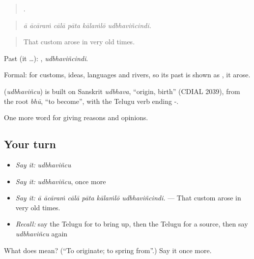 \begin{quote}
     .
\end{quote}

\begin{quote}
\emph{ā ācāraṁ cālā pāta kālaṁlō udbhaviñcindi.}
\end{quote}

\begin{quote}
That custom arose in very old times.
\end{quote}

Past (it …): , \emph{udbhaviñcindi}.

Formal: for customs, ideas, languages and rivers, so its past is shown as , it arose.

\begin{cousinweb}
\textbf{} (\emph{udbhaviñcu}) is built on Sanskrit \emph{udbhava}, \textquotedblleft{}origin, birth\textquotedblright{} (CDIAL 2039), from the root \emph{bhū}, \textquotedblleft{}to become\textquotedblright{}, with the Telugu verb ending -.
\end{cousinweb}

\begin{grammarlens}[title={What you've built}]
One more word for giving reasons and opinions.
\end{grammarlens}

\subsection*{Your turn}
\begin{itemize}
\raggedright
  \item \emph{Say it:} \emph{udbhaviñcu}
  \item \emph{Say it:} \emph{udbhaviñcu}, once more
  \item \emph{Say it:} \emph{ā ācāraṁ cālā pāta kālaṁlō udbhaviñcindi.} — That custom arose in very old times.
  \item \emph{Recall:} say the Telugu for to bring up, then the Telugu for a source, then say \emph{udbhaviñcu} again
\end{itemize}

\begin{tcolorbox}[breakable,colback=teal!4,colframe=teal!35!black,title={Before you move on}]
What does  mean? (\textquotedblleft{}To originate; to spring from\textquotedblright{}.) Say it once more.
\end{tcolorbox}
